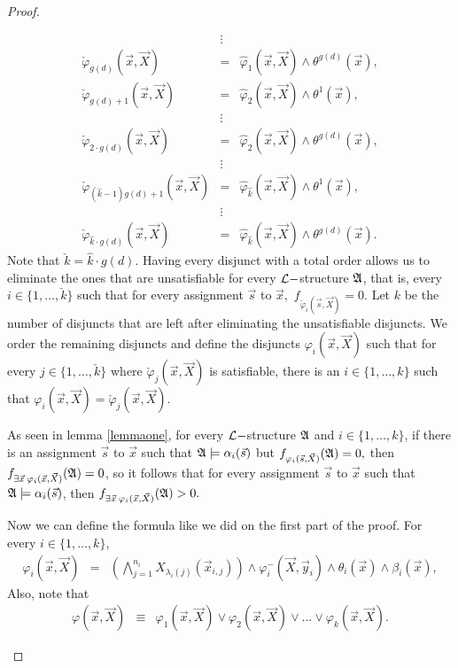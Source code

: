 \documentclass[12pt]{article}
\def\A{{\frak A}}
\def\L{{\cal L}}
\def\X{\vec{X}}
\def\s{\vec{s}}
\def\x{\vec{x}} %
\def\y{\vec{y}} %
\begin{document}
\begin{proof}
\begin{enumerate}
\begin{eqnarray*}
& \vdots & \\
\check{\varphi}_{g(d)}(\x,\X) &=& \hat{\varphi}_1(\x,\X) \wedge \theta^{g(d)}(\x), \\
\check{\varphi}_{g(d)+1}(\x,\X) &=& \hat{\varphi}_2(\x,\X) \wedge \theta^1(\x), \\
& \vdots & \\
\check{\varphi}_{2\cdot g(d)}(\x,\X) &=& \hat{\varphi}_2(\x,\X) \wedge \theta^{g(d)}(\x), \\
& \vdots & \\
\check{\varphi}_{(\hat{k}-1) g(d)+1}(\x,\X) &=& \hat{\varphi}_{\hat{k}}(\x,\X) \wedge \theta^1(\x), \\
& \vdots & \\
\check{\varphi}_{\hat{k} \cdot g(d)}(\x,\X) &=& \hat{\varphi}_{\hat{k}}(\x,\X) \wedge \theta^{g(d)}(\x).
\end{eqnarray*}
Note that $\check{k} = \hat{k} \cdot g(d).$ Having every disjunct with a total order allows us to eliminate the ones that are unsatisfiable for every $\L-$structure $\A$, that is, every $i\in\{1,\ldots,\check{k}\}$ such that for every assignment $\s$ to $\x,$ $f_{\check{\varphi}_i(\s,\X)} = 0.$ Let $k$ be the number of disjuncts that are left after eliminating the unsatisfiable disjuncts. We order the remaining disjuncts and define the disjuncts $\varphi_i(\x,\X)$ such that for every $j\in\{1,\ldots,\check{k}\}$ where $\check{\varphi}_j(\x,\X)$ is satisfiable, there is an $i\in\{1,\ldots,k\}$ such that $\varphi_i(\x,\X) = \check{\varphi}_j(\x,\X).$

As seen in lemma \ref{lemmaone}, for every $\L-$structure $\A$ and $i\in\{1,\ldots,k\}$, if there is an assignment $\s$ to $\x$ such that $\A\models\alpha_i(\s)$ but $f_{\varphi_i(\s,\X)}(\A) = 0,$ then $f_{\exists\x\:\varphi_i(\x,\X)}(\A) = 0$, so it follows that for every assignment $\s$ to $\x$ such that $\A\models\alpha_i(\s)$, then $f_{\exists\x\:\varphi_i(\x,\X)}(\A) > 0.$

Now we can define the formula like we did on the first part of the proof. For every $i\in\{1,\ldots,k\}$,
\begin{eqnarray*}
\varphi_i(\x,\X) &=& \left( \bigwedge_{j=1}^{n_i} X_{\lambda_i(j)}(\x_{i,j}) \right) \wedge \varphi^{-}_i(\X,\y_i) \wedge \theta_i(\x) \wedge \beta_i(\x),
\end{eqnarray*}
 Also, note that
\begin{eqnarray*}
\varphi(\x,\X) &\equiv& \varphi_1(\x,\X) \vee \varphi_2(\x,\X) \vee \dots  \vee \varphi_k(\x,\X).
\end{eqnarray*}


\end{enumerate}
\end{proof}
\end{document}
